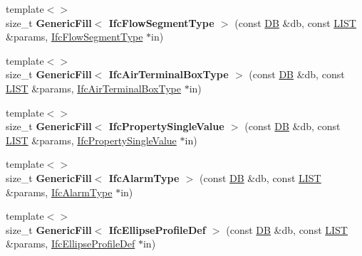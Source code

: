 \begin{DoxyCompactItemize}
\item 
\hypertarget{namespace_assimp_1_1_s_t_e_p_ac2b9e97b7ecd29bf3da85a4a32d78d7f}{{\footnotesize template$<$$>$ }\\size\+\_\+t {\bfseries Generic\+Fill$<$ Ifc\+Flow\+Segment\+Type $>$} (const \hyperlink{class_assimp_1_1_s_t_e_p_1_1_d_b}{D\+B} \&db, const \hyperlink{class_assimp_1_1_s_t_e_p_1_1_e_x_p_r_e_s_s_1_1_l_i_s_t}{L\+I\+S\+T} \&params, \hyperlink{struct_assimp_1_1_i_f_c_1_1_ifc_flow_segment_type}{Ifc\+Flow\+Segment\+Type} $\ast$in)}\label{namespace_assimp_1_1_s_t_e_p_ac2b9e97b7ecd29bf3da85a4a32d78d7f}

\item 
\hypertarget{namespace_assimp_1_1_s_t_e_p_a176c40f5fe90593de036c81d55c71e23}{{\footnotesize template$<$$>$ }\\size\+\_\+t {\bfseries Generic\+Fill$<$ Ifc\+Air\+Terminal\+Box\+Type $>$} (const \hyperlink{class_assimp_1_1_s_t_e_p_1_1_d_b}{D\+B} \&db, const \hyperlink{class_assimp_1_1_s_t_e_p_1_1_e_x_p_r_e_s_s_1_1_l_i_s_t}{L\+I\+S\+T} \&params, \hyperlink{struct_assimp_1_1_i_f_c_1_1_ifc_air_terminal_box_type}{Ifc\+Air\+Terminal\+Box\+Type} $\ast$in)}\label{namespace_assimp_1_1_s_t_e_p_a176c40f5fe90593de036c81d55c71e23}

\item 
\hypertarget{namespace_assimp_1_1_s_t_e_p_a8e7a9b9c207173b091e831a026a65a31}{{\footnotesize template$<$$>$ }\\size\+\_\+t {\bfseries Generic\+Fill$<$ Ifc\+Property\+Single\+Value $>$} (const \hyperlink{class_assimp_1_1_s_t_e_p_1_1_d_b}{D\+B} \&db, const \hyperlink{class_assimp_1_1_s_t_e_p_1_1_e_x_p_r_e_s_s_1_1_l_i_s_t}{L\+I\+S\+T} \&params, \hyperlink{struct_assimp_1_1_i_f_c_1_1_ifc_property_single_value}{Ifc\+Property\+Single\+Value} $\ast$in)}\label{namespace_assimp_1_1_s_t_e_p_a8e7a9b9c207173b091e831a026a65a31}

\item 
\hypertarget{namespace_assimp_1_1_s_t_e_p_a7f6ceccaaf4e50377e030aed30f8c946}{{\footnotesize template$<$$>$ }\\size\+\_\+t {\bfseries Generic\+Fill$<$ Ifc\+Alarm\+Type $>$} (const \hyperlink{class_assimp_1_1_s_t_e_p_1_1_d_b}{D\+B} \&db, const \hyperlink{class_assimp_1_1_s_t_e_p_1_1_e_x_p_r_e_s_s_1_1_l_i_s_t}{L\+I\+S\+T} \&params, \hyperlink{struct_assimp_1_1_i_f_c_1_1_ifc_alarm_type}{Ifc\+Alarm\+Type} $\ast$in)}\label{namespace_assimp_1_1_s_t_e_p_a7f6ceccaaf4e50377e030aed30f8c946}

\item 
\hypertarget{namespace_assimp_1_1_s_t_e_p_a8f9407c8b99eabe2055ba8442a1c0eb3}{{\footnotesize template$<$$>$ }\\size\+\_\+t {\bfseries Generic\+Fill$<$ Ifc\+Ellipse\+Profile\+Def $>$} (const \hyperlink{class_assimp_1_1_s_t_e_p_1_1_d_b}{D\+B} \&db, const \hyperlink{class_assimp_1_1_s_t_e_p_1_1_e_x_p_r_e_s_s_1_1_l_i_s_t}{L\+I\+S\+T} \&params, \hyperlink{struct_assimp_1_1_i_f_c_1_1_ifc_ellipse_profile_def}{Ifc\+Ellipse\+Profile\+Def} $\ast$in)}\label{namespace_assimp_1_1_s_t_e_p_a8f9407c8b99eabe2055ba8442a1c0eb3}


\end{DoxyCompactItemize}

